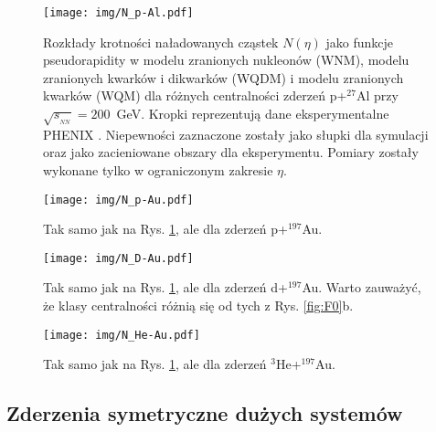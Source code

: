 \documentclass[a4paper,12pt]{article}
\begin{document}
\begin{figure}[H]
\begin{center}
\texttt{[image: img/N\_p-Al.pdf]}
\caption{Rozkłady krotności naładowanych cząstek $N(\eta)$ jako funkcje pseudorapidity \quad \quad \quad w modelu zranionych nukleonów (WNM), modelu zranionych kwarków i dikwarków (WQDM) i modelu zranionych kwarków (WQM) dla różnych centralności zderzeń p+$^{27}$Al przy $\sqrt{s_{_{NN}}}=200$~GeV. Kropki reprezentują dane eksperymentalne PHENIX \cite{Adare:2018toe}. Niepewności zaznaczone zostały jako słupki dla symulacji oraz jako zacieniowane obszary dla eksperymentu. Pomiary zostały wykonane tylko w ograniczonym zakresie $\eta$.\label{fig:p-Al} }
\end{center}
\end{figure}
\begin{figure}[H]
\begin{center}
\texttt{[image: img/N\_p-Au.pdf]}
\caption{Tak samo jak na Rys. \ref{fig:p-Al}, ale dla zderzeń p+$^{197}$Au.\label{fig:p-Au}}
\end{center}
\end{figure}
\begin{figure}[H]
\begin{center}
\texttt{[image: img/N\_D-Au.pdf]}
\caption{Tak samo jak na Rys. \ref{fig:p-Al}, ale dla zderzeń d+$^{197}$Au. Warto zauważyć, że klasy centralności różnią się od tych z Rys. \ref{fig:F0}b. \label{fig:d-Au}}
\end{center}
\end{figure}
\vspace{2em}
\begin{figure}[H]
\begin{center}
\texttt{[image: img/N\_He-Au.pdf]}
\caption{Tak samo jak na Rys. \ref{fig:p-Al}, ale dla zderzeń $^3$He+$^{197}$Au.\label{fig:He-Au}}
\end{center}
\end{figure}

\vspace*{-0.4in}
\subsection{Zderzenia symetryczne dużych systemów}
\end{document}
